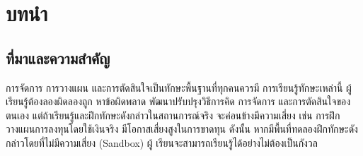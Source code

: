 \documentclass[12pt,oneside,openright,a4paper]{cpe-thai-project}
\begin{document}




\chapter{บทนำ}

\section{ที่มาและความสำคัญ}

การจัดการ การวางแผน และการตัดสินใจเป็นทักษะพื้นฐานที่ทุกคนควรมี 
การเรียนรู้ทักษะเหล่านี้ ผู้เรียนรู้ต้องลองผิดลองถูก หาข้อผิดพลาด พัฒนาปรับปรุงวิธีการคิด 
การจัดการ และการตัดสินใจของตนเอง แต่ถ้าเรียนรู้และฝึกทักษะดังกล่าวในสถานการณ์จริง 
จะค่อนข้างมีความเสี่ยง เช่น การฝึกวางแผนการลงทุนโดยใช้เงินจริง มีโอกาสเสี่ยงสูงในการขาดทุน 
ดังนั้น หากมีพื้นที่ทดลองฝึกทักษะดังกล่าวโดยที่ไม่มีความเสี่ยง (Sandbox) ผู้
เรียนจะสามารถเรียนรู้ได้อย่างไม่ต้องเป็นกังวล
\end{document}
